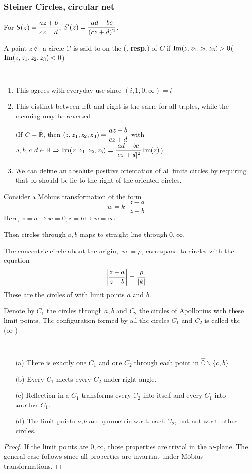 \subsubsection{Steiner Circles, circular net}
For  $ S(z)=\displaystyle\frac{az+b}{cz+d} $,  $ S'(z)=\displaystyle\frac{ad-bc }{(cz+d)^2} $.

A point  $ z\not\in  $ a circle  $ C $ is said to on the (, \textbf{resp.}) of  $ C $ if  $ \operatorname{Im}(z,z_1,z_2,z_3)>0 $($ \operatorname{Im}(z,z_1,z_2,z_3)<0 $)

\begin{remark}
    \,
    \begin{enumerate}
        \item This agrees with everyday use since  $ (i,1,0,\infty)=i $ 
        \item This distinct between left and right is the same for all triples, while the meaning may be reversed.
        
        (If  $ C=\hat{\mathbb{R}} $, then  $ (z,z_1,z_2,z_3)=\displaystyle\frac{az+b}{cz+d} $ with  $ a,b,c,d\in\mathbb{R} \Rightarrow \operatorname{Im}(z,z_1,z_2,z_3)=\displaystyle\frac{ad-bc}{|cz+d|^2}\operatorname{Im}(z)$)
        \item We can define an absolute positive orientation of all finite circles by requiring that  $ \infty $ should be lie to the right of the oriented circles. 
    \end{enumerate}
    Consider a M{\"o}bius transformation of the form 
    \[w=k\cdot\frac{z-a}{z-b}\]
    Here,  $ z=a\mapsto w=0,z=b\mapsto w=\infty $.
    
    Then circles through  $ a,b $ maps to straight line through  $ 0,\infty $.
    
    The concentric circle about the origin, $ |w|=\rho $, correspond to circles with the equation 
    \[\displaystyle\left|\frac{z-a}{z-b}\right|=\frac{\rho}{|k|}\]
    These are the circles of  with limit points  $ a $ and  $ b $. 
\end{remark}
Denote by  $ C_1 $ the circles through  $ a,b $ and  $ C_2 $ the circles of Apollonius with these limit points. The configuration formed by all the circles  $ C_1 $ and  $ C_2 $ is called the (or )
\begin{theorem}
    \,
    \begin{enumerate}
        \item[(a)] There is exactly one  $ C_1 $ and one  $ C_2 $ through each point in  $ \hat{\mathbb{C}}\backslash\{a,b\} $
        \item[(b)] Every  $ C_1 $  meets every  $ C_2 $ under right angle.
        \item[(c)] Reflection in a  $ C_1 $ transforms every  $ C_2 $ into itself and every  $ C_1 $ into another  $ C_1 $.
        \item[(d)] The limit points  $ a,b $ are symmetric w.r.t. each  $ C_2 $, but not w.r.t. other circles.     
    \end{enumerate}
\end{theorem}   
\begin{proof}
    If the limit points are  $ 0,\infty $, those properties are trivial in the  $ w $-plane. The general case follows since all properties are invariant under M{\"o}bius transformations.
\end{proof}
